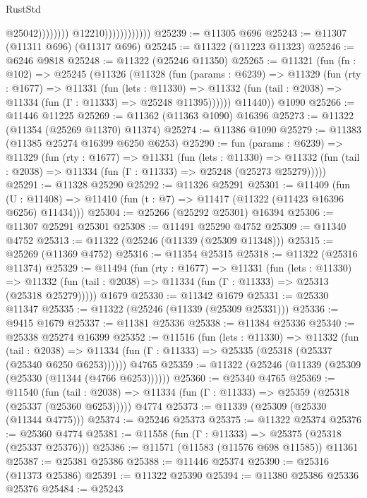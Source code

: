 \begin{lexlean}{RustStd}
\begin{coremodule}
                                            @25042))))))))
                            @12210))))))))))))
@25239 := @11305 @696
@25243 := @11307 (@11311 @696) (@11317 @696)
@25245 := @11322 (@11223 @11323)
@25246 := @6246 @9818
@25248 := @11322 (@25246 @11350)
@25265 := @11321
    (fun (fn : @102) =>
    @25245
      (@11326
        (@11328
          (fun (params : @6239) =>
          @11329
            (fun (rty : @1677) =>
            @11331
              (fun (lets : @11330) =>
              @11332 (fun (tail : @2038) => @11334 (fun (Γ : @11333) => @25248 @11395))))))
        @11440))
    @1090
@25266 := @11446 @11225
@25269 := @11362 (@11363 @1090) @16396
@25273 := @11322 (@11354 (@25269 @11370) @11374)
@25274 := @11386 @1090
@25279 := @11383 (@11385 @25274 @16399 @6250 @6253)
@25290 := fun (params : @6239) =>
  @11329
    (fun (rty : @1677) =>
    @11331
      (fun (lets : @11330) =>
      @11332 (fun (tail : @2038) => @11334 (fun (Γ : @11333) => @25248 (@25273 @25279)))))
@25291 := @11328 @25290
@25292 := @11326 @25291
@25301 := @11409
    (fun (U : @11408) => @11410 (fun (t : @7) => @11417 (@11322 (@11423 @16396 @6256) @11434)))
@25304 := @25266 (@25292 @25301) @16394
@25306 := @11307 @25291 @25301
@25308 := @11491 @25290 @4752
@25309 := @11340 @4752
@25313 := @11322 (@25246 (@11339 (@25309 @11348)))
@25315 := @25269 (@11369 @4752)
@25316 := @11354 @25315
@25318 := @11322 (@25316 @11374)
@25329 := @11494
    (fun (rty : @1677) =>
    @11331
      (fun (lets : @11330) =>
      @11332 (fun (tail : @2038) => @11334 (fun (Γ : @11333) => @25313 (@25318 @25279)))))
    @1679
@25330 := @11342 @1679
@25331 := @25330 @11347
@25335 := @11322 (@25246 (@11339 (@25309 @25331)))
@25336 := @9415 @1679
@25337 := @11381 @25336
@25338 := @11384 @25336
@25340 := @25338 @25274 @16399
@25352 := @11516
    (fun (lets : @11330) =>
    @11332
      (fun (tail : @2038) =>
      @11334 (fun (Γ : @11333) => @25335 (@25318 (@25337 (@25340 @6250 @6253))))))
    @4765
@25359 := @11322 (@25246 (@11339 (@25309 (@25330 (@11344 (@4766 @6253))))))
@25360 := @25340 @4765
@25369 := @11540
    (fun (tail : @2038) => @11334 (fun (Γ : @11333) => @25359 (@25318 (@25337 (@25360 @6253)))))
    @4774
@25373 := @11339 (@25309 (@25330 (@11344 @4775)))
@25374 := @25246 @25373
@25375 := @11322 @25374
@25376 := @25360 @4774
@25381 := @11558 (fun (Γ : @11333) => @25375 (@25318 (@25337 @25376)))
@25386 := @11571 (@11583 (@11576 @698 @11585)) @11361
@25387 := @25381 @25386
@25388 := @11446 @25374
@25390 := @25316 (@11373 @25386)
@25391 := @11322 @25390
@25394 := @11380 @25386 @25336 @25376
@25484 := @25243

\end{coremodule}
\end{lexlean}
